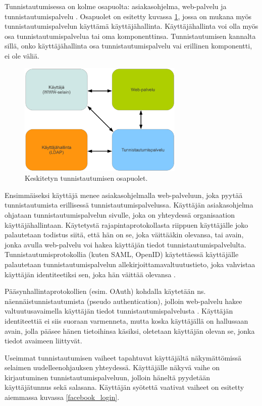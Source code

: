 Tunnistautumisessa on kolme osapuolta: asiakasohjelma, web-palvelu ja tunnistautumispalvelu \cite{nisti}. Osapuolet on esitetty kuvassa \ref{composition}, jossa on mukana myös tunnistautumispalvelun käyttämä käyttäjähallinta. Käyttäjähallinta voi olla myös osa tunnistautumispalvelua tai oma komponenttinsa. Tunnistautumisen kannalta sillä, onko käyttäjähallinta osa tunnistautumispalvelu vai erillinen komponentti, ei ole väliä.

\begin{figure}[ht]
\centering
\includegraphics[width=0.7\textwidth]{teknologiat/composition.eps}
\caption{Keskitetyn tunnistautumisen osapuolet.}%
\label{composition}
\end{figure}

Ensimmäiseksi käyttäjä menee asiakasohjelmalla web-palveluun, joka pyytää tunnistautumista erillisessä tunnistautumispalvelussa. Käyttäjän asiakasohjelma ohjataan tunnistautumispalvelun sivulle, joka on yhteydessä organisaation käyttäjähallintaan. Käytetystä rajapintaprotokollasta riippuen käyttäjälle joko palautetaan todistus siitä, että hän on se, joka väittääkin olevansa, tai avain, jonka avulla web-palvelu voi hakea käyttäjän tiedot tunnistautumispalvelulta. Tunnistautumisprotokollia (kuten SAML, OpenID) käytettäessä käyttäjälle palautetaan tunnistautumispalvelun allekirjoittamavaltuutustieto, joka vahvistaa käyttäjän identiteetiksi sen, joka hän väittää olevansa \cite{nisti}.

Pääsynhallintaprotokollien (esim. OAuth) kohdalla käytetään ns. näennäistunnistautumista (pseudo authentication), jolloin web-palvelu hakee valtuutusavaimella käyttäjän tiedot tunnistautumispalvelusta \cite{distributed_web_security}. Käyttäjän identiteettiä ei siis suoraan varmenneta, mutta koska käyttäjällä on hallussaan avain, jolla pääsee hänen tietoihinsa käsiksi, oletetaan käyttäjän olevan se, jonka tiedot avaimeen liittyvät.

Useimmat tunnistautumisen vaiheet tapahtuvat käyttäjältä näkymättömissä selaimen uudelleenohjauksen yhteydessä. Käyttäjälle näkyvä vaihe on kirjautuminen tunnistautumispalveluun, jolloin häneltä pyydetään käyttäjätunnus sekä salasana. Käyttäjän syötettä vaativat vaiheet on esitetty aiemmassa kuvassa \ref{facebook_login}.